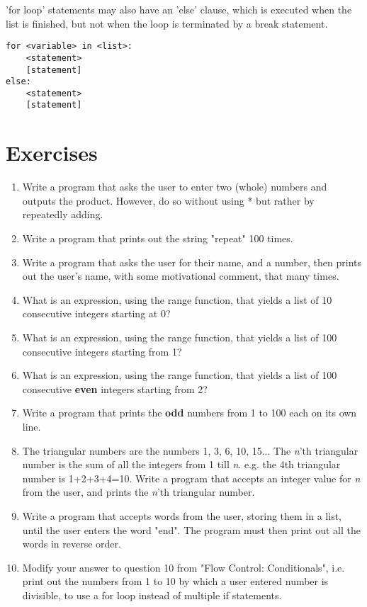 'for loop' statements may also have an 'else' clause, which is   executed when the list is finished, but not when the loop is   terminated by a break statement.
\begin{lstlisting}
for <variable> in <list>:
    <statement>
    [statement]
else:
    <statement>
    [statement]
\end{lstlisting}

\section{Exercises}
\begin{enumerate}
	\item Write a program that asks the user to enter two (whole) numbers and outputs the product. However, do so without using * but rather by repeatedly adding.
	\item Write a program that prints out the string "repeat" 100 times.
	\item Write a program that asks the user for their name, and a    number, then prints out the user's name, with some motivational comment, that many times.
	\item What is an expression, using the range function, that yields a    list of 10 consecutive integers starting at 0?
	\item What is an expression, using the range function, that yields a    list of 100 consecutive integers starting from 1?
	\item What is an expression, using the range function, that yields a    list of 100 consecutive \textbf{even} integers starting    from 2?
	\item Write a program that prints the \textbf{odd} numbers from 1 to 100 each on    its own line.
	\item The triangular numbers are the numbers 1, 3, 6, 10, 15... The \textit{n}'th triangular number is the sum of all the integers from 1 till \textit{n}. e.g. the 4th triangular number is 1+2+3+4=10. Write a program that accepts an integer value for \textit{n} from the user, and prints the \textit{n}'th triangular number.
	\item Write a program that accepts words from the user, storing them in a list, until the user enters the word "end". The program must then print out all the words in reverse order.
	\item Modify your answer to question 10 from "Flow Control:    Conditionals", i.e. print out the numbers from 1 to 10 by which a    user entered number is divisible, to use a for loop instead of    multiple if statements.

\end{enumerate}
